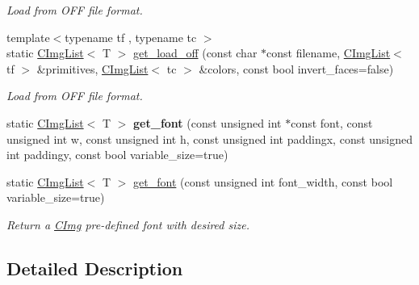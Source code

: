\begin{DoxyCompactItemize}
\begin{DoxyCompactList}\small\item\em Load from OFF file format. \item\end{DoxyCompactList}\item 
\hypertarget{structcimg__library_1_1_c_img_list_a714b22ed3853682fc5fc31b2fcf6556c}{
{\footnotesize template$<$typename tf , typename tc $>$ }\\static \hyperlink{structcimg__library_1_1_c_img_list}{CImgList}$<$ T $>$ \hyperlink{structcimg__library_1_1_c_img_list_a714b22ed3853682fc5fc31b2fcf6556c}{get\_\-load\_\-off} (const char $\ast$const filename, \hyperlink{structcimg__library_1_1_c_img_list}{CImgList}$<$ tf $>$ \&primitives, \hyperlink{structcimg__library_1_1_c_img_list}{CImgList}$<$ tc $>$ \&colors, const bool invert\_\-faces=false)}
\label{structcimg__library_1_1_c_img_list_a714b22ed3853682fc5fc31b2fcf6556c}

\begin{DoxyCompactList}\small\item\em Load from OFF file format. \item\end{DoxyCompactList}\item 
\hypertarget{structcimg__library_1_1_c_img_list_a3e32366da872fdac807ce3cbfc8b989f}{
static \hyperlink{structcimg__library_1_1_c_img_list}{CImgList}$<$ T $>$ {\bfseries get\_\-font} (const unsigned int $\ast$const font, const unsigned int w, const unsigned int h, const unsigned int paddingx, const unsigned int paddingy, const bool variable\_\-size=true)}
\label{structcimg__library_1_1_c_img_list_a3e32366da872fdac807ce3cbfc8b989f}

\item 
static \hyperlink{structcimg__library_1_1_c_img_list}{CImgList}$<$ T $>$ \hyperlink{structcimg__library_1_1_c_img_list_aea5741eec2dd5c9234d13e14054659db}{get\_\-font} (const unsigned int font\_\-width, const bool variable\_\-size=true)
\begin{DoxyCompactList}\small\item\em Return a \hyperlink{structcimg__library_1_1_c_img}{CImg} pre-\/defined font with desired size. \item\end{DoxyCompactList}\end{DoxyCompactItemize}


\subsection{Detailed Description}
